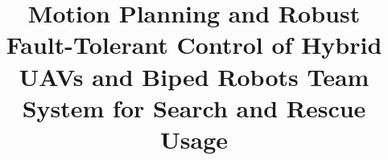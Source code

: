 \documentclass{ieeeaccess}
\begin{document}


\title{Motion Planning and Robust Fault-Tolerant Control of Hybrid UAVs and Biped Robots Team System for Search and Rescue Usage}


\end{document}
